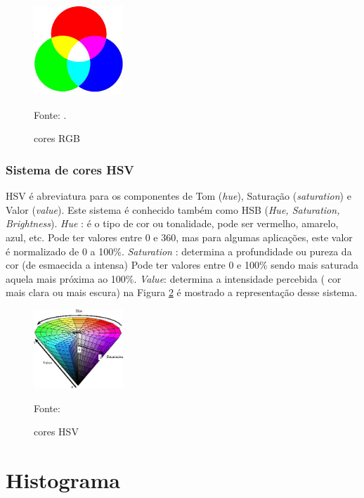 \begin{figure}[H]
 \centering
 \includegraphics[width=0.30\textwidth]{./fig/fundamentacao/cores-rgb}
 \caption{cores RGB}
 Fonte: \cite{coresRGB}.
 \label{fig:imgCORES}
\end{figure}

\subsubsection{Sistema de cores HSV}
\label{subsub:siscores-HSV}


HSV é abreviatura para os componentes de Tom (\textit{hue}), Saturação (\textit{saturation}) e Valor (\textit{value}). Este sistema é conhecido também como HSB (\textit{Hue, Saturation, Brightness}). 
\textit{Hue} :  é o tipo de cor ou tonalidade, pode ser vermelho, amarelo, azul, etc. Pode ter valores entre 0 e 360, mas para algumas aplicações, este valor é normalizado de 0 a 100\%.
\textit{Saturation} : determina a profundidade ou pureza da cor (de esmaecida a intensa) Pode ter valores entre 0 e 100\% sendo mais saturada aquela mais próxima ao 100\%.
\textit{Value}: determina a intensidade percebida ( cor mais clara ou mais escura)
na Figura \ref{fig:imgHSV} é mostrado a representação desse sistema.

\begin{figure}[H]
 \centering
 \includegraphics[width=0.30\textwidth]{./fig/fundamentacao/hsvcone}
 \caption{cores HSV}
 Fonte: \cite{coresHSV}
 \label{fig:imgHSV}
\end{figure}

\section{Histograma}
\label{sec:histograma}

